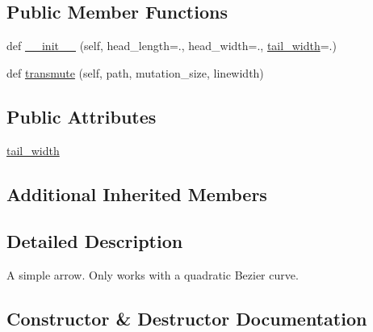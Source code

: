 \subsection*{Public Member Functions}
\begin{DoxyCompactItemize}
\item 
def \hyperlink{classmatplotlib_1_1patches_1_1ArrowStyle_1_1Simple_a87cc4ab12d2470d7cfe58a606c79be18}{\+\_\+\+\_\+init\+\_\+\+\_\+} (self, head\+\_\+length=., head\+\_\+width=., \hyperlink{classmatplotlib_1_1patches_1_1ArrowStyle_1_1Simple_a25ca5219b32e3d8ad0aea3cdedc21115}{tail\+\_\+width}=.)
\item 
def \hyperlink{classmatplotlib_1_1patches_1_1ArrowStyle_1_1Simple_a039d61b26059a33ad7a5b25d68a0cfee}{transmute} (self, path, mutation\+\_\+size, linewidth)
\end{DoxyCompactItemize}
\subsection*{Public Attributes}
\begin{DoxyCompactItemize}
\item 
\hyperlink{classmatplotlib_1_1patches_1_1ArrowStyle_1_1Simple_a25ca5219b32e3d8ad0aea3cdedc21115}{tail\+\_\+width}
\end{DoxyCompactItemize}
\subsection*{Additional Inherited Members}


\subsection{Detailed Description}
\begin{DoxyVerb}A simple arrow. Only works with a quadratic Bezier curve.\end{DoxyVerb}
 

\subsection{Constructor \& Destructor Documentation}
\mbox{\label{classmatplotlib_1_1patches_1_1ArrowStyle_1_1Simple_a87cc4ab12d2470d7cfe58a606c79be18}} 
